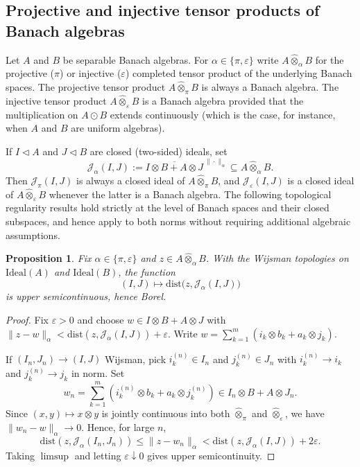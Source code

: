 \documentclass[12pt,fleqn,a4paper]{amsart}
\renewcommand{\le}{\leqslant}
\numberwithin{equation}{section}
\newtheorem{proposition}[theorem]{Proposition}
\theoremstyle{definition}
\newcommand{\Ideal}{\mathrm{Ideal}}
\newcommand{\dist}{\mathrm{dist}}
\begin{document}
\subsection{Projective and injective tensor products of Banach algebras}

Let $A$ and $B$ be separable Banach algebras.  For $\alpha\in\{\pi,\varepsilon\}$ write
$A\widehat\otimes_\alpha B$ for the projective ($\pi$) or injective ($\varepsilon$)
completed tensor product of the underlying Banach spaces.
The projective tensor product $A\widehat\otimes_\pi B$ is always a Banach algebra.
The injective tensor product $A\widehat\otimes_\varepsilon B$ is a Banach algebra
provided that the multiplication on $A\odot B$ extends continuously (which is the case,
for instance, when $A$ and $B$ are uniform algebras).

If $I\triangleleft A$ and $J\triangleleft B$ are closed
(two-sided) ideals, set
\[
\mathcal J_\alpha(I,J):=\overline{I\otimes B + A\otimes J}^{\ \|\cdot\|_\alpha}
\subseteq A\widehat\otimes_\alpha B.
\]
Then $\mathcal J_\pi(I,J)$ is always a closed ideal of $A\widehat\otimes_\pi B$, and
$\mathcal J_\varepsilon(I,J)$ is a closed ideal of $A\widehat\otimes_\varepsilon B$
whenever the latter is a Banach algebra.
The following topological regularity results hold strictly at the level of Banach
spaces and their closed subspaces, and hence apply to both norms without requiring
additional algebraic assumptions.

\begin{proposition}\label{prop:banach-tensor-usc}
Fix $\alpha\in\{\pi,\varepsilon\}$ and $z\in A\widehat\otimes_\alpha B$.
With the Wijsman topologies on $\Ideal(A)$ and $\Ideal(B)$, the function
\[
(I,J)\longmapsto \dist\bigl(z,\mathcal J_\alpha(I,J)\bigr)
\]
is upper semicontinuous, hence Borel.
\end{proposition}

\begin{proof}
Fix $\varepsilon>0$ and choose $w\in I\otimes B + A\otimes J$ with
$\|z-w\|_\alpha<\dist(z,\mathcal J_\alpha(I,J))+\varepsilon$.
Write $w=\sum_{k=1}^m(i_k\otimes b_k+a_k\otimes j_k)$.

If $(I_n,J_n)\to(I,J)$ Wijsman, pick $i_k^{(n)}\in I_n$ and $j_k^{(n)}\in J_n$ with
$i_k^{(n)}\to i_k$ and $j_k^{(n)}\to j_k$ in norm.
Set
\[
w_n=\sum_{k=1}^m(i_k^{(n)}\otimes b_k+a_k\otimes j_k^{(n)})
\in I_n\otimes B+A\otimes J_n.
\]
Since $(x,y)\mapsto x\otimes y$ is jointly continuous into both
$\widehat\otimes_\pi$ and $\widehat\otimes_\varepsilon$, we have
$\|w_n-w\|_\alpha\to 0$.
Hence, for large $n$,
\[
\dist(z,\mathcal J_\alpha(I_n,J_n))\le \|z-w_n\|_\alpha
<\dist(z,\mathcal J_\alpha(I,J))+2\varepsilon.
\]
Taking $\limsup$ and letting $\varepsilon\downarrow 0$ gives upper semicontinuity.
\end{proof}
\end{document}
